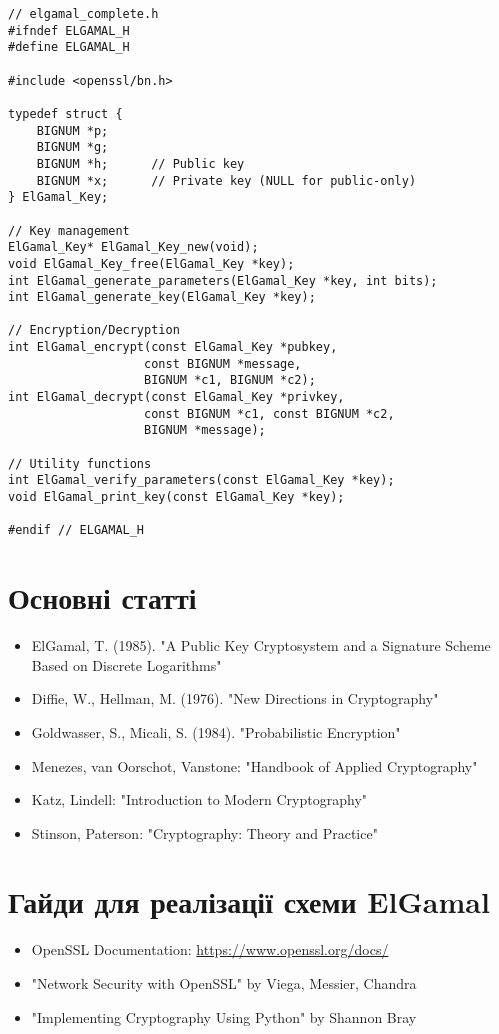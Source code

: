 \begin{verbatim}
// elgamal_complete.h
#ifndef ELGAMAL_H
#define ELGAMAL_H

#include <openssl/bn.h>

typedef struct {
    BIGNUM *p;
    BIGNUM *g;
    BIGNUM *h;      // Public key
    BIGNUM *x;      // Private key (NULL for public-only)
} ElGamal_Key;

// Key management
ElGamal_Key* ElGamal_Key_new(void);
void ElGamal_Key_free(ElGamal_Key *key);
int ElGamal_generate_parameters(ElGamal_Key *key, int bits);
int ElGamal_generate_key(ElGamal_Key *key);

// Encryption/Decryption
int ElGamal_encrypt(const ElGamal_Key *pubkey, 
                   const BIGNUM *message,
                   BIGNUM *c1, BIGNUM *c2);
int ElGamal_decrypt(const ElGamal_Key *privkey,
                   const BIGNUM *c1, const BIGNUM *c2,
                   BIGNUM *message);

// Utility functions
int ElGamal_verify_parameters(const ElGamal_Key *key);
void ElGamal_print_key(const ElGamal_Key *key);

#endif // ELGAMAL_H
\end{verbatim}

\section{Основні статті}
\begin{itemize}
    \item ElGamal, T. (1985). "A Public Key Cryptosystem and a Signature Scheme Based on Discrete Logarithms"
    \item Diffie, W., Hellman, M. (1976). "New Directions in Cryptography"
    \item Goldwasser, S., Micali, S. (1984). "Probabilistic Encryption"
    \item Menezes, van Oorschot, Vanstone: "Handbook of Applied Cryptography"
    \item Katz, Lindell: "Introduction to Modern Cryptography"
    \item Stinson, Paterson: "Cryptography: Theory and Practice"
\end{itemize}

\section{Гайди для реалізації схеми ElGamal}
\begin{itemize}
    \item OpenSSL Documentation: \url{https://www.openssl.org/docs/}
    \item "Network Security with OpenSSL" by Viega, Messier, Chandra
    \item "Implementing Cryptography Using Python" by Shannon Bray
\end{itemize}
